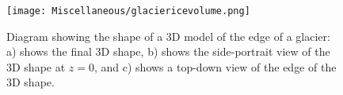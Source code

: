 \documentclass{exam}
\begin{document}
\begin{figure}[ht]
    \centering
    \texttt{[image: Miscellaneous/glaciericevolume.png]}
    \caption{ Diagram showing the shape of a 3D model of the edge of a glacier: a) shows the final 3D shape, b) shows the side-portrait view of the 3D shape at $z=0$, and c) shows a top-down view of the edge of the 3D shape.}
    \label{fig:glacier}
\end{figure}





    


\vspace{5mm}
\end{document}
